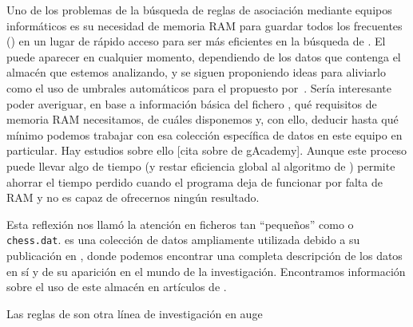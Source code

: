 Uno de los problemas de la búsqueda de reglas de asociación mediante equipos informáticos es su necesidad de memoria RAM para guardar todos los \itemsets frecuentes (\aprioriL) en un lugar de rápido acceso para ser más eficientes en la búsqueda de \ars. El \dilemaIR puede aparecer en cualquier momento, dependiendo de los datos que contenga el almacén \D que estemos analizando, y se siguen proponiendo ideas para aliviarlo como el uso de umbrales automáticos para el \soporte propuesto por~\citet{SadhasivamAngamuthu_MiningRareItemsetWithAutomatedSupportThresholds_2011}. Sería interesante poder averiguar, en base a información básica del fichero \D, qué requisitos de memoria RAM necesitamos, de cuáles disponemos y, con ello, deducir hasta qué \soporte mínimo podemos trabajar con esa colección específica de datos en este equipo en particular. Hay estudios sobre ello [cita sobre \mushroom de gAcademy]. Aunque este proceso puede llevar algo de tiempo (y restar eficiencia global al algoritmo de \FIM) permite ahorrar el tiempo perdido cuando el programa deja de funcionar por falta de RAM y no es capaz de ofrecernos ningún resultado.

Esta reflexión nos llamó la atención en ficheros tan "`pequeños"' como \mushroom o \texttt{chess.dat}. \mushroom es una colección de datos ampliamente utilizada debido a su publicación en , donde podemos encontrar una completa descripción de los datos en sí y de su aparición en el mundo de la investigación. Encontramos información sobre el uso de este almacén \D en artículos de \clasificacion.

Las reglas de \clasificacion son otra línea de investigación en auge~\citep{LiuHsuMa_IntegratingClassificationAndARM_1998}

